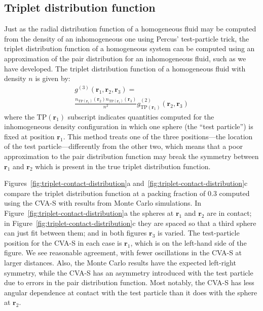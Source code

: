 \documentclass[letterpaper,twocolumn,amsmath,amssymb,pre,aps,10pt]{revtex4-1}
\newcommand{\rr}{\textbf{r}}
\begin{document}
\subsection{Triplet distribution function}

Just as the radial distribution function of a homogeneous fluid may be
computed from the density of an inhomogeneous one using Percus'
test-particle trick, the triplet distribution function of a
homogeneous system can be computed using an approximation of the pair
distribution for an inhomogeneous fluid, such as we have
developed. The triplet distribution function of a homogeneous fluid
with density $n$ is given by:
\begin{multline}
    g^{(3)}(\rr_1,\rr_2,\rr_3) =\\
    \frac{n_{\textrm{TP}(\rr_1)}(\rr_2)
      n_{\textrm{TP}(\rr_1)}(\rr_3)}{n^2}
    g^{(2)}_{\textrm{TP}(\rr_1)}(\rr_2,\rr_3)
\end{multline}
where the $\textrm{TP}(\rr_1)$ subscript indicates quantities computed for
the inhomogeneous density configuration in which one sphere (the
``test particle'') is fixed
at position $\rr_1$.  This method treats one of the three
positions---the location of the test particle---differently from the
other two, which means that a poor approximation to the pair distribution
function may break the symmetry between $\rr_1$ and $\rr_2$ which is
present in the true triplet distribution function.

Figures~\ref{fig:triplet-contact-distribution}a
and~\ref{fig:triplet-contact-distribution}c compare the triplet
distribution function at a packing fraction of 0.3 computed using the
CVA-S with results from Monte Carlo simulations. In
Figure~\ref{fig:triplet-contact-distribution}a the spheres at $\rr_1$
and $\rr_2$ are in contact; in
Figure~\ref{fig:triplet-contact-distribution}c they are spaced so that
a third sphere can just fit between them; and in both figures $\rr_3$
is varied. The test-particle position for the CVA-S in each case is
$\rr_1$, which is on the left-hand side of the figure. We see
reasonable agreement, with fewer oscillations in the CVA-S at larger
distances. Also, the Monte Carlo results have the expected left-right
symmetry, while the CVA-S has an asymmetry introduced with
the test particle due to errors in the pair distribution
function. Most notably, the CVA-S has less angular dependence at
contact with the test particle than it does with the sphere at
$\rr_2$.
\end{document}
